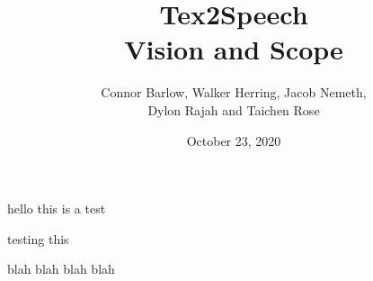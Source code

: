 \documentclass[letterpaper,12pt]{article}
\title{Tex2Speech\\Vision and Scope}
\author{Connor Barlow, Walker Herring, Jacob Nemeth,\\Dylon Rajah and Taichen Rose}
\date{October 23, 2020}
\begin{document}
\maketitle

hello this is a test

  testing this 
 

blah blah
blah blah



\end{document}
